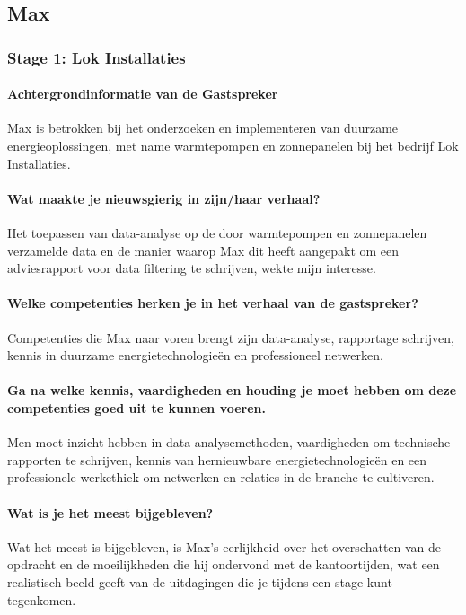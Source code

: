 \subsection{Max}
\subsubsection{Stage 1: Lok Installaties}
\paragraph{Achtergrondinformatie van de Gastspreker}
Max is betrokken bij het onderzoeken en implementeren van duurzame energieoplossingen, met name warmtepompen en zonnepanelen bij het bedrijf Lok Installaties.

\paragraph{Wat maakte je nieuwsgierig in zijn/haar verhaal?}
Het toepassen van data-analyse op de door warmtepompen en zonnepanelen verzamelde data en de manier waarop Max dit heeft aangepakt om een adviesrapport voor data filtering te schrijven, wekte mijn interesse.

\paragraph{Welke competenties herken je in het verhaal van de gastspreker?}
Competenties die Max naar voren brengt zijn data-analyse, rapportage schrijven, kennis in duurzame energietechnologieën en professioneel netwerken.

\paragraph{Ga na welke kennis, vaardigheden en houding je moet hebben om deze competenties goed uit te kunnen voeren.}
Men moet inzicht hebben in data-analysemethoden, vaardigheden om technische rapporten te schrijven, kennis van hernieuwbare energietechnologieën en een professionele werkethiek om netwerken en relaties in de branche te cultiveren.


\paragraph{Wat is je het meest bijgebleven?}
Wat het meest is bijgebleven, is Max's eerlijkheid over het overschatten van de opdracht en de moeilijkheden die hij ondervond met de kantoortijden, wat een realistisch beeld geeft van de uitdagingen die je tijdens een stage kunt tegenkomen.

